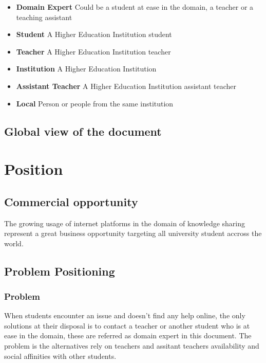 \documentclass[12pt,a4paper,oneside, titlepage]{article}
\begin{document}
		\begin{itemize}
		
		    \item \textbf{Domain Expert} Could be a student at ease in the domain, a teacher or a teaching assistant 
		    \item \textbf{Student} A Higher Education Institution student
		    \item \textbf{Teacher} A Higher Education Institution teacher
		    \item \textbf{Institution} A Higher Education Institution
		    \item \textbf{Assistant Teacher} A Higher Education Institution assistant teacher
		    \item \textbf{Local} Person or people from the same institution
		  
		\end{itemize}
	
		\subsection{Global view of the document}
		
    \newpage
	\section{Position}		
		
		\subsection{Commercial opportunity}
		    The growing usage of internet platforms in the domain of knowledge sharing
		    represent a great business opportunity targeting all university student accross 
		    the world.
		    
		    
		\subsection{Problem Positioning}
		
         \subsubsection{Problem}
         When students encounter an issue and doesn't find any help online, the only solutions at their disposal
         is to contact a teacher or another student who is at ease in the domain, these are referred as domain 
         expert in this document. The problem is the alternatives rely on teachers and assitant teachers 
         availability and social affinities with other students.
         
\end{document}
